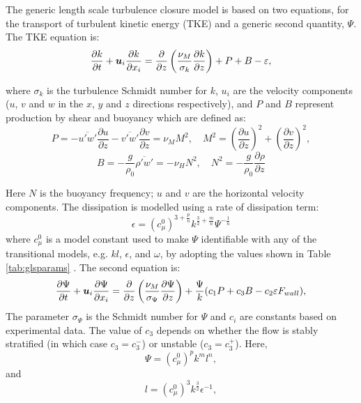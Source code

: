 The generic length scale turbulence closure model \citep{umlauf2003} is based
on two equations, for the transport of turbulent kinetic energy (TKE) and a
generic second quantity, $\Psi$. The TKE equation is:
\begin{equation}
\frac{\partial k}{\partial t} + {\mbox{\boldmath$u$}}_i\frac{\partial k}{\partial x_i} =
\frac{\partial}{\partial z}\left(\frac{\nu_M}{\sigma_k}\frac{\partial k}{\partial z}\right) + P + B - \varepsilon,
\label{eq:tke_one}
\end{equation}

\noindent 
where $\sigma_k$ is the turbulence Schmidt number for $k$, $u_i$ are the
velocity components ($u$, $v$ and $w$ in the $x$, $y$ and $z$ directions 
respectively), and $P$ and $B$ represent production by shear and buoyancy
which are defined as:
\begin{equation}
P=-\overline{u'w'}\frac{\partial u}{\partial z}-\overline{v'w'}
\frac{\partial v}{\partial z}=\nu_MM^2, \quad M^2=
\left(\frac{\partial u}{\partial z}\right)^2 + \left(\frac{\partial v}{\partial z}\right)^2,
\end{equation}
\begin{equation}
B=-\frac{g}{\rho_0}\overline{\rho'w'}=-\nu_HN^2, \quad N^2= -\frac{g}{\rho_0}\frac{\partial\rho}{\partial z}
\end{equation}

Here $N$ is the buoyancy frequency; $u$ and $v$ are the horizontal velocity 
components. The dissipation is modelled using a rate of dissipation term:
\begin{equation}
\epsilon=\left(c_\mu^0\right)^{3+\frac{p}{n}}k^{\frac{3}{2}+\frac{m}{n}}\Psi^{-\frac{1}{n}}
\end{equation}
where $c_\mu^0$ is a model constant used to make $\Psi$ identifiable with any of the transitional
models, e.g. $kl$, $\epsilon$, and $\omega$, by adopting the values shown in Table \ref{tab:glsparams} \citep{umlauf2003}.
The second equation is:
\begin{equation}
\frac{\partial \Psi}{\partial t} + {\mbox{\boldmath$u$}}_i\frac{\partial \Psi}{\partial x_i} =
\frac{\partial}{\partial z}\left(\frac{\nu_M}{\sigma_\Psi}\frac{\partial \Psi}{\partial z}\right) +
\frac{\Psi}{k}(c_1P + c_3B - c_2\varepsilon F_{wall}),
\label{eq:psi_one}
\end{equation}
\noindent
The parameter $\sigma_\Psi$ is the Schmidt number for $\Psi$ and $c_i$ are
constants based on experimental data. The value of $c_3$ depends on whether the flow
is stably stratified (in which case $c_3=c_3^-$) or unstable ($c_3=c_3^+$).
Here,
\begin{equation}
\Psi=\left(c_\mu^0\right)^pk^ml^n,
\label{eq:psi}
\end{equation}
and
\begin{equation}
l=\left(c_\mu^0\right)^3k^{\frac{3}{2}}\epsilon^{-1},
\end{equation}

